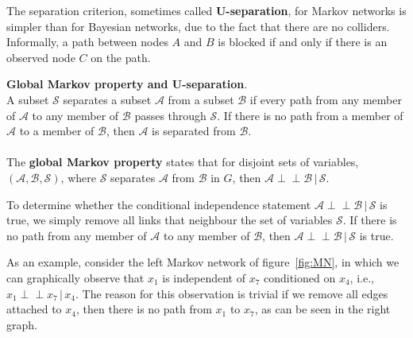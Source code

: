 \documentclass{article}
\newcommand{\indep}{\perp \!\!\! \perp}
\begin{document}
The separation criterion, sometimes called \textbf{U-separation}, for Markov networks is simpler than for Bayesian networks, due to the fact that there are no colliders. Informally, a path between nodes $A$ and $B$ is blocked if and only if there is an observed node $C$ on the path. 
\\
\begin{theorem}
    \textbf{Global Markov property and U-separation}. 
    \\
    A subset $\mathcal{S}$ separates a subset $\mathcal{A}$ from a subset $\mathcal{B}$ if every path from any member of $\mathcal{A}$ to any member of $\mathcal{B}$ passes through $\mathcal{S}$. If there is no path from a member of $\mathcal{A}$ to a member of $\mathcal{B}$, then $\mathcal{A}$ is separated from $\mathcal{B}$. 
    \\\\
    The \textbf{global Markov property} states that for disjoint sets of variables, $(\mathcal{A}, \mathcal{B}, \mathcal{S})$, where $\mathcal{S}$ separates $\mathcal{A}$ from $\mathcal{B}$ in $G$, then $\mathcal{A} \indep \mathcal{B} \,|\, \mathcal{S}$.
\end{theorem}

\noindent To determine whether the conditional independence statement $\mathcal{A} \indep \mathcal{B} \,|\, \mathcal{S}$ is true, we simply remove all links that neighbour the set of variables $\mathcal{S}$. If there is no path from any member of $\mathcal{A}$ to any member of $\mathcal{B}$, then $\mathcal{A} \indep \mathcal{B} \,|\, \mathcal{S}$ is true. 

As an example, consider the left Markov network of figure~\ref{fig:MN}, in which we can graphically observe that $x_1$ is independent of $x_7$ conditioned on $x_4$, i.e., $x_1 \indep x_7 \,|\, x_4$. The reason for this observation is trivial if we remove all edges attached to $x_4$, then there is no path from $x_1$ to $x_7$, as can be seen in the right graph.  
\end{document}
